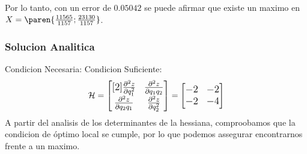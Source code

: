 \begin{homeworkProblem}
Por lo tanto, con un error de $0.05042$ se puede afirmar que existe un maximo en $X=\paren{\frac{11565}{1157};\frac{23130}{1157}}$.


\subsubsection{Solucion Analitica}
Condicion Necesaria:
Condicion Suficiente:\\
\begin{align*}
    \mathcal{H}=\large{\begin{bmatrix}[2]
        \frac{\partial^2 z}{\partial q_1^2}  & \frac{\partial^2 z}{\partial q_1q_2} \\
         \frac{\partial^2 z}{\partial q_2q_1} & \frac{\partial^2 z}{\partial q_2^2}
    \end{bmatrix}} = \begin{bmatrix}
        -2 & -2 \\ -2 & -4
    \end{bmatrix}
\end{align*}
A partir del analisis de los determinantes de la hessiana, comproobamos que la condicion de óptimo local se cumple, por lo que podemos assegurar encontrarnos frente a un maximo.
\end{homeworkProblem}
